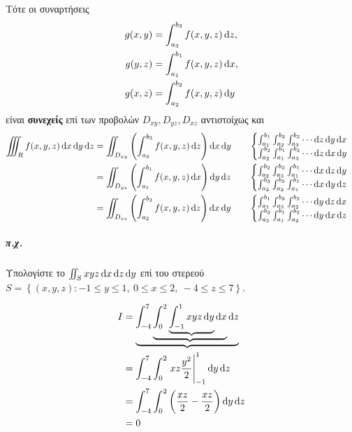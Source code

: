 \documentclass[11pt,a4paper,titlepage,draft]{article}
\begin{document}
Τότε οι συναρτήσεις
\begin{align*}
g(x,y)&=\int_{a_3}^{b_3}f(x,y,z)\dif z,\\
g(y,z)&=\int_{a_1}^{b_1}f(x,y,z)\dif x,\\
g(x,z)&=\int_{a_2}^{b_2}f(x,y,z)\dif y
\end{align*}
είναι \textbf{συνεχείς} επί των προβολών \(D_{xy},D_{yz},D_{xz}\) αντιστοίχως και
\begin{align*}
\iiint_R f(x,y,z)\dif x \dif y \dif z & =
\iint_{D_{xy}} \left(
\int_{a_3}^{b_3} f(x,y,z) \dif z
\right) \dif x \dif y  \qquad
\begin{cases}
\int_{a_1}^{b_1}\int_{a_2}^{b_2}\int_{a_3}^{b_3} \cdots \dif z \dif y \dif x\\
\int_{a_2}^{b_2}\int_{a_1}^{b_1}\int_{a_3}^{b_3} \cdots \dif z \dif x \dif y
\end{cases}
\\
& =
\iint_{D_{yz}} \left(
\int_{a_1}^{b_1} f(x,y,z) \dif x
\right) \dif y \dif z \qquad \begin{cases}
\int_{a_2}^{b_2}\int_{a_3}^{b_3}\int_{a_1}^{b_1} \cdots \dif x \dif z \dif y\\
\int_{a_2}^{b_3}\int_{a_2}^{b_2}\int_{a_1}^{b_1} \cdots \dif x \dif y \dif z
\end{cases}\\
& =
\iint_{D_{xz}} \left(
\int_{a_2}^{b_2} f(x,y,z) \dif z
\right) \dif x \dif y \qquad
\begin{cases}
\int_{a_1}^{b_1}\int_{a_3}^{b_3}\int_{a_2}^{b_2} \cdots \dif y \dif z \dif x\\
\int_{a_3}^{b_3}\int_{a_1}^{b_1}\int_{a_2}^{b_2} \cdots \dif y \dif x \dif z
\end{cases}
\end{align*}

\subparagraph{π.χ.}
Υπολογίστε το \(\iint_S xyz \dif x \dif z \dif y\) επί του στερεού \(S= \left\lbrace (x,y,z): -1 \leq y \leq 1,\ 0\leq x \leq 2,\ -4 \leq z \leq 7  \right\rbrace\).

\begin{align*}
I &= \underbrace{\int_{-4}^7 \underbrace{\int_0^2 \underbrace{\int_{-1}^1 x y z \dif y} \dif x} \dif z}\\
&= \int_{-4}^7 \int_0^2 \left. xz \frac{y^2}{2}\right|_{-1}^1 \dif y \dif z\\
&= \int_{-4}^7 \int_0^2 \left( \frac{xz}{2} - \frac{xz}{2}\right) \dif y \dif z\\
&= 0
\end{align*}
\end{document}
